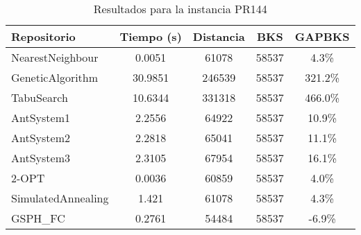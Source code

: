\begin{table}[H]
\centering
\caption{Resultados para la instancia PR144}
\begin{tabular}{|l|c|c|c|c|}
\hline
\textbf{Repositorio} & \textbf{Tiempo (s)} & \textbf{Distancia} & \textbf{BKS} & \textbf{GAPBKS} \\ 
\hline
NearestNeighbour & 0.0051 & 61078 & 58537 & 4.3\% \\ 
GeneticAlgorithm & 30.9851 & 246539 & 58537 & 321.2\% \\ 
TabuSearch & 10.6344 & 331318 & 58537 & 466.0\% \\ 
AntSystem1 & 2.2556 & 64922 & 58537 & 10.9\% \\ 
AntSystem2 & 2.2818 & 65041 & 58537 & 11.1\% \\ 
AntSystem3 & 2.3105 & 67954 & 58537 & 16.1\% \\ 
2-OPT & 0.0036 & 60859 & 58537 & 4.0\% \\ 
SimulatedAnnealing & 1.421 & 61078 & 58537 & 4.3\% \\ 
GSPH_FC & 0.2761 & 54484 & 58537 & -6.9\% \\ 
\hline
\end{tabular}
\end{table}
